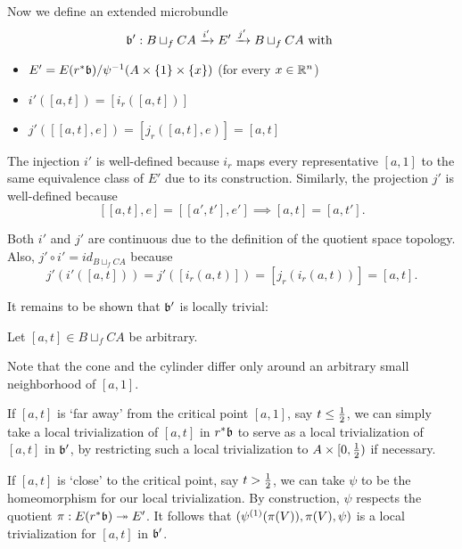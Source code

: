 \begin{myproof}
    Now we define an extended microbundle
    \[ \bundledef{\bb'}{B \sqcup_f CA}{E'}{i'}{j'} \twith \]
    \begin{itemize}
        \item $E' = E(\ind{r}\bb) / \inv{\psi}(A \cross \{1\} \cross \{x\})$ (for every $x \in \mathbb{R}^n$)
        \item $i'([a, t]) = [i_r([a, t])]$
        \item $j'([[a, t], e]) = [j_r([a, t], e)] = [a, t]$
    \end{itemize}
    The injection $i'$ is well-defined because $i_r$ maps every
    representative $[a, 1]$ to the same equivalence
    class of $E'$ due to its construction.
    Similarly, the projection $j'$ is well-defined because
    \[ [[a, t], e] = [[a', t'], e'] \implies  [a, t] = [a, t']. \]

    Both $i'$ and $j'$ are continuous
    due to the definition of the quotient space topology.
    Also, $j' \circ i' = id_{B \sqcup_f CA}$ because
    \[ j'(i'([a, t])) = j'([i_r(a, t)]) = [j_r(i_r(a, t))] = [a, t]. \]
    
    It remains to be shown that $\bb'$ is locally trivial:

    Let $[a, t] \in B \sqcup_f CA$ be arbitrary.

    Note that the cone and the cylinder differ only
    around an arbitrary small neighborhood of $[a, 1]$.

    If $[a, t]$ is `far away' from the critical point $[a, 1]$,
    say $t \le \frac{1}{2}$, we can simply take a local trivialization of $[a, t]$ in $\ind{r}\bb$
    to serve as a local trivialization of $[a, t]$ in $\bb'$,
    by restricting such a local trivialization to $A \times [0, \frac{1}{2})$ if necessary.

    If $[a, t]$ is `close' to the critical point, say $t > \frac{1}{2}$,
    we can take $\psi$ to be the homeomorphism for our local trivialization.
    By construction, $\psi$ respects the quotient $\pi: E(\ind{r}\bb) \subm E'$.
    It follows that $(\psi^{(1)}(\pi(V)), \pi(V), \psi)$
    is a local trivialization for $[a, t]$ in $\bb'$.
\end{myproof}